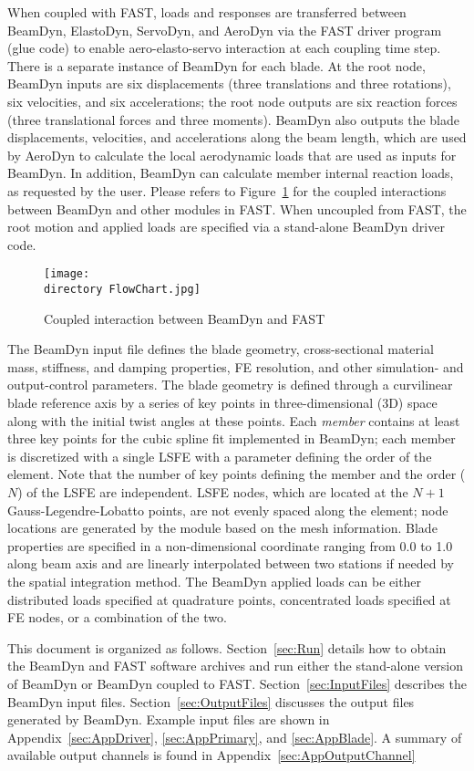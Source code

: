 When coupled with FAST, loads and responses are transferred between BeamDyn, ElastoDyn, ServoDyn, and AeroDyn via the FAST driver program (glue code) to enable aero-elasto-servo interaction at each coupling time step. 
There is a separate instance of BeamDyn for each blade. 
At the root node, BeamDyn inputs are six displacements (three translations and three rotations), six velocities, and six accelerations; the root node outputs are six reaction forces (three translational forces and three moments). 
BeamDyn also outputs the blade displacements, velocities, and accelerations along the beam length, which are used by AeroDyn to calculate the local aerodynamic loads that are used as inputs for BeamDyn. 
In addition, BeamDyn can calculate member internal reaction loads, as requested by the user. 
Please refers to Figure~\ref{fig:FlowChart} for the coupled interactions between BeamDyn and other modules in FAST. 
When uncoupled from FAST, the root motion and applied loads are specified via a stand-alone BeamDyn driver code.
\begin{figure}
    \centering
    \texttt{[image: \\directory FlowChart.jpg]}
    \caption{Coupled interaction between BeamDyn and FAST}
    \label{fig:FlowChart}
\end{figure}

The BeamDyn input file defines the blade geometry, cross-sectional material mass, stiffness, and damping properties, FE resolution, and other simulation- and output-control parameters. 
The blade geometry is defined through a curvilinear blade reference axis by a series of key points in three-dimensional (3D) space along with the initial twist angles at these points. 
Each \textit{member} contains at least three key points for the cubic spline fit implemented in BeamDyn; each member is discretized with a single LSFE with a parameter defining the order of the element. 
Note that the number of key points defining the member and the order ($N$) of the LSFE are independent.
LSFE nodes, which are located at the $N+1$ Gauss-Legendre-Lobatto points, are not evenly spaced along the element; node locations are generated by the module based on the mesh information. 
Blade properties are specified in a non-dimensional coordinate ranging from 0.0 to 1.0 along beam axis and are linearly interpolated between two stations if needed by the spatial integration method. 
The BeamDyn applied loads can be either distributed loads specified at quadrature points,  concentrated loads specified at FE nodes, or a combination of the two.  

This document is organized as follows. Section~\ref{sec:Run} details how to obtain the BeamDyn and FAST software archives and run either the stand-alone version of BeamDyn or BeamDyn coupled to FAST. Section~\ref{sec:InputFiles} describes the BeamDyn input files. Section~\ref{sec:OutputFiles} discusses the output files generated by BeamDyn. Example input files are shown in Appendix~\ref{sec:AppDriver}, \ref{sec:AppPrimary}, and  \ref{sec:AppBlade}. A summary of available output channels is found in Appendix~\ref{sec:AppOutputChannel}
